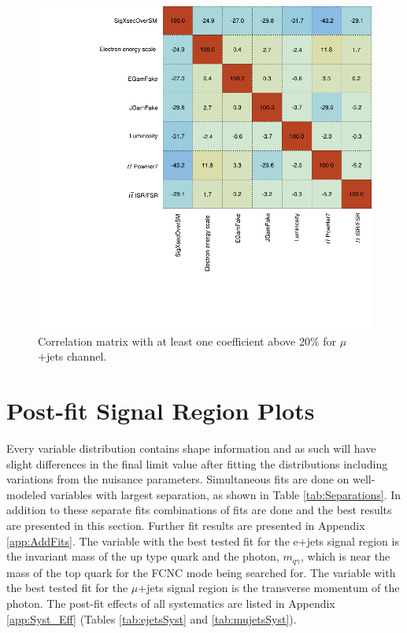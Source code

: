 \begin{figure}[h!]
	\centering
	\includegraphics[width=.5\columnwidth]{../ThesisImages/RegionPlots/FinalRegions/Systematics/MQGamEJetPHptMJet/FCNC_All_mujets/CorrMatrix.png}
	\caption[Correlation matrix  with at least one coefficient above 20\% for $\mu$+jets channel]{Correlation matrix  with at least one coefficient above 20\% for $\mu$+jets channel. }
	\label{fig:Corrmujets}
\end{figure}

\section{Post-fit Signal Region Plots}
\label{sec:PostFitSR}
Every variable distribution contains shape information and as such will have slight differences in the final limit value after fitting the distributions including variations from the nuisance parameters.  Simultaneous fits are done on well-modeled variables with largest separation, as shown in Table \ref{tab:Separations}.  In addition to these separate fits combinations of fits are done and the best results are presented in this section.  Further fit results are presented in Appendix \ref{app:AddFits}. The variable with the best tested fit for the e+jets signal region is the invariant mass of the up type quark and the photon, $m_{q\gamma}$, which is near the mass of the top quark for the FCNC mode being searched for. The variable with the best tested fit for the $\mu$+jets signal region is the transverse momentum of the photon.  The post-fit effects of all systematics are listed in Appendix \ref{app:Syst_Eff} (Tables \ref{tab:ejetsSyst} and \ref{tab:mujetsSyst}).

